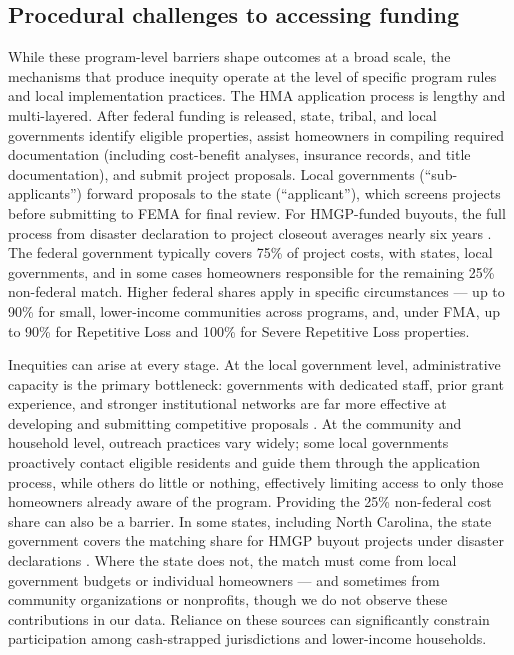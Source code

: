 \documentclass[
  authoryear,
  preprint]{elsarticle}
\begin{document}
\subsection{Procedural challenges to accessing
funding}\label{procedural-challenges-to-accessing-funding}

While these program-level barriers shape outcomes at a broad scale, the
mechanisms that produce inequity operate at the level of specific
program rules and local implementation practices. The HMA application
process is lengthy and multi-layered. After federal funding is released,
state, tribal, and local governments identify eligible properties,
assist homeowners in compiling required documentation (including
cost-benefit analyses, insurance records, and title documentation), and
submit project proposals. Local governments (``sub-applicants'') forward
proposals to the state (``applicant''), which screens projects before
submitting to FEMA for final review. For HMGP-funded buyouts, the full
process from disaster declaration to project closeout averages nearly
six years \citep{machManagedRetreatVoluntary2019}. The federal
government typically covers 75\% of project costs, with states, local
governments, and in some cases homeowners responsible for the remaining
25\% non-federal match. Higher federal shares apply in specific
circumstances --- up to 90\% for small, lower-income communities across
programs, and, under FMA, up to 90\% for Repetitive Loss and 100\% for
Severe Repetitive Loss properties.

Inequities can arise at every stage. At the local government level,
administrative capacity is the primary bottleneck: governments with
dedicated staff, prior grant experience, and stronger institutional
networks are far more effective at developing and submitting competitive
proposals
\citep{machManagedRetreatVoluntary2019, junodEquitableInvestmentsResilience2021a}.
At the community and household level, outreach practices vary widely;
some local governments proactively contact eligible residents and guide
them through the application process, while others do little or nothing,
effectively limiting access to only those homeowners already aware of
the program. Providing the 25\% non-federal cost share can also be a
barrier. In some states, including North Carolina, the state government
covers the matching share for HMGP buyout projects under disaster
declarations \citep{ncdpsHazardMitigationGrant2026}. Where the state
does not, the match must come from local government budgets or
individual homeowners --- and sometimes from community organizations or
nonprofits, though we do not observe these contributions in our data.
Reliance on these sources can significantly constrain participation
among cash-strapped jurisdictions and lower-income households.
\end{document}
